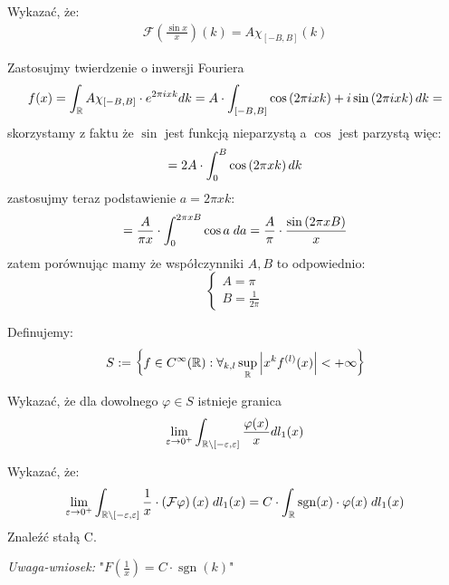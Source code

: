 \documentclass[11pt]{scrartcl}
\DeclareMathOperator{\sgn}{sgn}
\begin{document}
    \newpage

    \begin{zadanie*}
        Wykazać, że:
        \begin{gather*}
            \mathcal{F} \left ( \frac{\sin x}{x} \right ) (k) = A \chi_{[- B, B]} (k)
        \end{gather*}
    \end{zadanie*}

    Zastosujmy twierdzenie o inwersji Fouriera
    \[
        f(x) = \int_{\mathbb R} A \chi_{[-B, B]} \cdot e^{2 \pi i x k} dk = 
        A \cdot \int_{[-B, B]} \cos \left ( 2 \pi i x k \right ) + i \sin \left ( 2 \pi i x k \right ) dk =
    \]
    skorzystamy z faktu że $\sin$ jest funkcją nieparzystą a $\cos$ jest parzystą więc:
    \[
        = 2A \cdot \int_0^B \cos \left ( 2 \pi x k \right ) dk
    \]
    zastosujmy teraz podstawienie $a = 2 \pi x k$:
    \[
        = \frac{A}{\pi x} \cdot \int_0^{2 \pi x B} \cos a \; da 
        = \frac{A}{\pi} \cdot \frac{\sin \left ( 2 \pi x B \right )}{x}
    \]
    zatem porównując mamy że współczynniki $A, B$ to odpowiednio:
    \[
        \begin{cases}
            A = \pi \\
            B = \frac{1}{2 \pi}
        \end{cases}
    \] 

    \begin{zadanie*}
        Definujemy:
        \[
            S := \left \{ f \in C^{\infty } (\mathbb R) : 
                \forall_{k,l} \sup_{\mathbb R} \left\lvert x^k f^{(l)} (x) \right\rvert < + \infty   \right \}
        \]

        \begin{walk}
            \item Wykazać, że dla dowolnego $\varphi \in S$ istnieje granica
                \[
                    \lim_{\varepsilon \to 0^+} \int_{\mathbb R \backslash [-\varepsilon, \varepsilon]} 
                        \frac{\varphi (x)}{x} dl_1 (x)  
                \]
            \item Wykazać, że:
                \[
                     \lim_{\varepsilon \to 0^+} \int_{\RR \backslash [-\varepsilon, \varepsilon]} 
                         \frac{1}{x} \cdot \left ( \mathcal{F} \varphi  \right ) (x) \; dl_1 (x) =
                         C \cdot \int_{\RR} \sgn (x) \cdot \varphi (x) \; dl_1(x)
                \]
                Znaleźć stałą C.
        \end{walk}

        \textit{Uwaga-wniosek:} "$F \left ( \frac{1}{x} \right ) = C \cdot \sgn (k)$" 
    \end{zadanie*}
    
\end{document}
